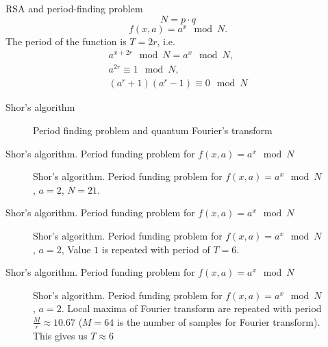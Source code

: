 \documentclass[10pt,pdf,hyperref={unicode}]{beamer}
\begin{document}
\begin{frame}{RSA and period-finding problem}
\[
N = p \cdot q
\]
\[
f\left(x, a\right) = a^x \mod N.
\]
The period of the function is $T = 2r$, i.e.
\begin{eqnarray}
a^{x+2r} \mod N = a^x \mod N,
\nonumber \\
a^{2r} \equiv 1 \mod N,
\nonumber \\
(a^r + 1)(a^r - 1)  \equiv 0 \mod N
\nonumber
\end{eqnarray}
\end{frame}

\begin{frame}{Shor's algorithm}
\begin{figure}
\centering

\scalebox{.8}{}

\caption{ Period finding problem and quantum Fourier's transform}
\end{figure}
\end{frame}


\begin{frame}{Shor's algorithm. Period funding problem for 
  $f\left(x, a\right) = a^x \mod{N}$}
\begin{figure}
\centering

\scalebox{.65}{}

\caption{Shor's algorithm. Period funding problem for 
  $f\left(x, a\right) = a^x \mod{N}$, $a=2$, $N = 21$.}
\end{figure}
\end{frame}

\begin{frame}{Shor's algorithm. Period funding problem for
  $f\left(x, a\right) = a^x \mod{N}$}
\begin{figure}
\centering

\scalebox{.65}{}

\caption{Shor's algorithm. Period funding problem for
  $f\left(x, a\right) = a^x \mod{N}$, $a=2$,  
  Value $1$ is repeated with period of $T=6$.}
\end{figure}
\end{frame}

\begin{frame}{Shor's algorithm. Period funding problem for
  $f\left(x, a\right) = a^x \mod{N}$}
\begin{figure}
\centering

\scalebox{.6}{}

\caption{Shor's algorithm. Period funding problem for
  $f\left(x, a\right) = a^x \mod{N}$, $a=2$. 
  Local maxima of Fourier transform are repeated with period
  $\frac{M}{r} \approx 10.67$ ($M = 64$ is the number of samples for
  Fourier transform). This gives us $T\approx 6$}
\end{figure}
\end{frame}
\end{document}

